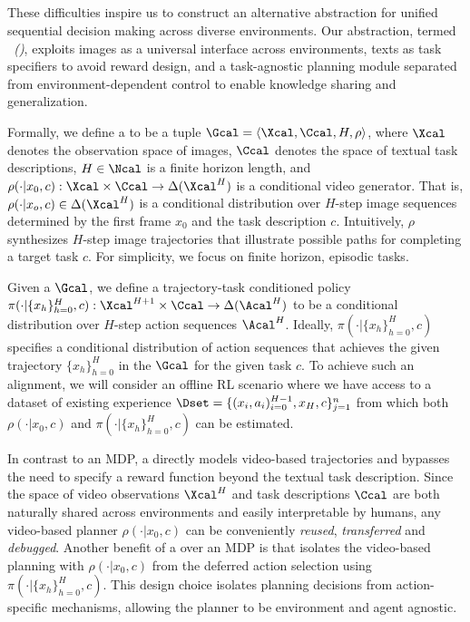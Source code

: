 \vspace{-5pt}
\subsection{\process}\label{subsec:udp}
\vspace{-3pt}

These difficulties inspire us to construct an alternative abstraction for unified sequential decision making across diverse environments. Our abstraction, termed \emph{\process~(\proc)}, exploits images as a universal interface across environments, texts as task specifiers to avoid reward design, and a task-agnostic planning module separated from environment-dependent control to enable knowledge sharing and generalization. %

Formally, we define a \proc to be a tuple $\Gcal = \langle \Xcal, \Ccal, H, \rho\rangle$, %
where $\Xcal$ denotes the observation space of images, $\Ccal$ denotes the space of textual task descriptions, $H\in \Ncal$ is a finite horizon length, and $\rho(\cdot| x_0, c): \Xcal \times\Ccal\rightarrow \Delta(\Xcal^H)$ 
is a conditional video generator.
That is, $\rho(\cdot|x_o,c)\in\Delta(\Xcal^H)$ is a conditional distribution over $H$-step image sequences determined by the first frame $x_0$ and the task description $c$. 
Intuitively, $\rho$ synthesizes $H$-step image trajectories that illustrate possible paths for completing a target task $c$. For simplicity, we focus on finite horizon, episodic tasks.

Given a \proc $\Gcal$, 
we define a trajectory-task conditioned policy $\pi(\cdot| \{x_h\}_{h=0}^H, c): \Xcal^{H+1}\times\Ccal\rightarrow \Delta(\Acal^{H})$ to be a conditional distribution over $H$-step action sequences $\Acal^H$.
Ideally, $\pi(\cdot| \{x_h\}_{h=0}^H, c)$ specifies a conditional distribution of action sequences that achieves the given trajectory $\{x_h\}_{h=0}^H$ in the \proc $\Gcal$ for the given task $c$.
To achieve such an alignment, we will consider an offline RL scenario where we have access to a dataset of existing experience $\Dset = \{(x_i, a_i)_{i=0}^{H-1}, x_H, c\}_{j=1}^n$
from which both $\rho(\cdot|x_0, c)$ and $\pi(\cdot| \{x_h\}_{h=0}^H, c)$ can be estimated.


In contrast to an MDP, a \proc directly models video-based trajectories and bypasses the need to specify a reward function beyond the textual task description. Since the space of video observations $\Xcal^H$ and task descriptions $\Ccal$ are both naturally shared across environments and easily interpretable by humans, any video-based planner $\rho(\cdot|x_0, c)$ can be conveniently \emph{reused}, \emph{transferred} and \emph{debugged}. 
Another benefit of a \proc over an MDP is that \proc isolates the video-based planning with $\rho(\cdot|x_0, c)$ from the deferred action selection using $\pi(\cdot|\{x_h\}_{h=0}^H, c)$. This design choice isolates planning decisions from action-specific mechanisms, allowing the planner to be environment and agent agnostic. %

